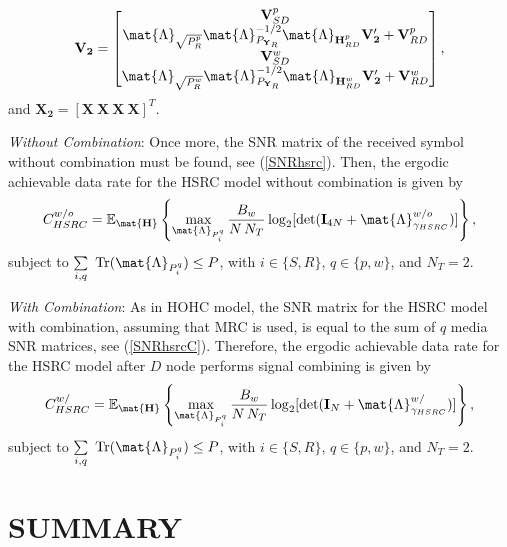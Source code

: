 \begin{equation}
\mathbf{V_2} = \begin{bmatrix} \mathbf{V}_{SD}^p \\ \mat{\Lambda}_{\sqrt{P_{R}^{p}}} \mat{\Lambda}_{P_{\mathbf{Y}_{R}}}^{-1/2} \mat{\Lambda}_{\mathbf{H}_{RD}^p} \mathbf{V'_2} + \mathbf{V}_{RD}^{p} \\ \mathbf{V}_{SD}^w \\ \mat{\Lambda}_{\sqrt{P_{R}^{w}}} \mat{\Lambda}_{P_{\mathbf{Y}_{R}}}^{-1/2} \mat{\Lambda}_{\mathbf{H}_{RD}^w} \mathbf{V'_2} + \mathbf{V}_{RD}^{w} \end{bmatrix},
\end{equation}
and $ \mathbf{X_2} = [\mathbf{X} \ \mathbf{X} \ \mathbf{X} \ \mathbf{X}]^T $.

\textit{Without Combination}: Once more, the \ac{SNR} matrix of the received symbol without combination must be found, see (\ref{SNRhsrc}). Then, the ergodic achievable data rate for the \ac{HSRC} model without combination is given by
\begin{equation}
	C_{HSRC}^{w/o} = \mathbb{E}_{ \mat{\mathbf{H}}} \left\{\max_{\mat{\Lambda}_{P_{i}^{q}}} \dfrac{B_{w}}{N \, N_{T}} \log_{2} [\text{det}(\mathbf{I}_{4N} + \mat{\Lambda}_{\gamma_{HSRC}}^{w/o} )]\right\},
\end{equation}
subject to $ \sum\limits_{i,q} \ \text{Tr}(\mat{\Lambda}_{P_{i}^{q}}) \leq P $, with $i \in \{S,R\}$, $q \in \{p,w\}$, and $ N_{T} = 2 $.

\textit{With Combination}: As in \ac{HOHC} model, the \ac{SNR} matrix for the \ac{HSRC} model with combination, assuming that \ac{MRC} is used, is equal to the sum of $q$ media \ac{SNR} matrices, see (\ref{SNRhsrcC}). Therefore, the ergodic achievable data rate for the \ac{HSRC} model after $D$ node performs signal combining is given by
\begin{equation}
C_{HSRC}^{w/} = \mathbb{E}_{ \mat{\mathbf{H}}} \left\{\max_{\mat{\Lambda}_{P_{i}^{q}}} \dfrac{B_{w}}{N \, N_{T}} \log_{2} [\text{det}(\mathbf{I}_{N} + \mat{\Lambda}_{\gamma_{HSRC}}^{w/} )]\right\},
\end{equation}
subject to $ \sum\limits_{i,q} \ \text{Tr}(\mat{\Lambda}_{P_{i}^{q}}) \leq P $, with $i \in \{S,R\}$, $q \in \{p,w\}$, and $ N_{T} = 2 $.

\section{SUMMARY}  \label{sec:SUM_HSRC}

